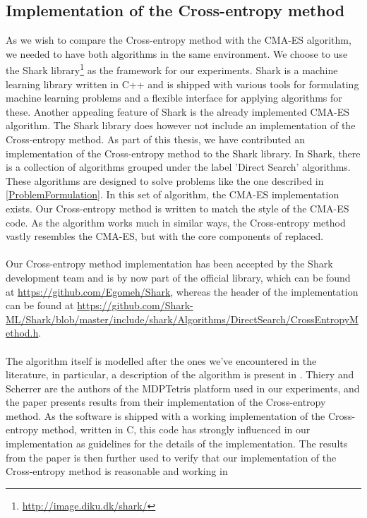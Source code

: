 \subsection{Implementation of the Cross-entropy method}

As we wish to compare the Cross-entropy method 
with the CMA-ES algorithm, we needed to have both algorithms
in the same environment. We choose to use the Shark 
library\footnote{\url{http://image.diku.dk/shark/}}
as the framework for our experiments. Shark is a machine 
learning library written in C++ and is shipped with various tools
for formulating machine learning problems and a flexible 
interface for applying algorithms for these. Another appealing
feature of Shark is the already implemented CMA-ES algorithm.
The Shark library does however not include an implementation of
the Cross-entropy method. As part of this thesis, we have contributed
an implementation of the Cross-entropy method to the Shark library.
In Shark, there is a collection of algorithms grouped under the label
'Direct Search' algorithms. These algorithms are designed to solve 
problems like the one described in \ref{ProblemFormulation}. In this
set of algorithm, the CMA-ES implementation exists. Our Cross-entropy method 
is written to match the style of the CMA-ES code. As the algorithm
works much in similar ways, the Cross-entropy method vastly resembles the CMA-ES, 
but with the core components of replaced.\\
\\
Our Cross-entropy method implementation has been accepted by the Shark development team and is 
by now part of the official library, which can be found at 
\url{https://github.com/Egomeh/Shark}, whereas the header of the 
implementation can be found at 
\url{https://github.com/Shark-ML/Shark/blob/master/include/shark/Algorithms/DirectSearch/CrossEntropyMethod.h}.\\
\\
The algorithm itself is modelled after the ones we've encountered 
in the literature, in particular, a description of the algorithm is 
present in \citep{thiery:09}. Thiery and Scherrer are the authors of the 
MDPTetris platform used in our experiments, and the paper presents 
results from their implementation of the Cross-entropy method. As the 
software is shipped with a working implementation of the Cross-entropy method, written in C,
this code has strongly influenced in our implementation as guidelines for
the details of the implementation. The results from the paper is then further used
to verify that our implementation of the Cross-entropy method is reasonable and working in 

